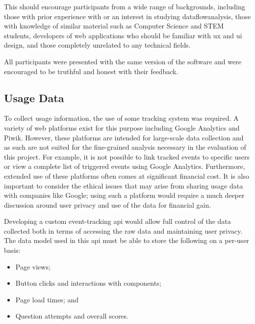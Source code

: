 \documentclass[bsc,twoside,singlespacing,parskip,logo,notimes,normalheadings]{infthesis}
\begin{document}
    This should encourage participants from a wide range of
    backgrounds, including those with prior experience with or an
    interest in studying \gls{dataflowanalysis}, those with knowledge
    of similar material such as Computer Science and STEM students,
    developers of web applications who should be familiar with
    \gls{ux} and \gls{ui} design, and those completely unrelated to
    any technical fields.

    All participants were presented with the same version of the
    software and were encouraged to be truthful and honest with their
    feedback.

        \subsection{Usage Data}\label{sec:impl-tracking-api}
        To collect usage information, the use of some tracking system
        was required. A variety of web platforms exist for this
        purpose including Google Analytics and Piwik. However, these
        platforms are intended for large-scale data collection and as
        such are not suited for the fine-grained analysis necessary in
        the evaluation of this project. For example, it is not
        possible to link tracked events to specific users or view a
        complete list of triggered events using Google
        Analytics. Furthermore, extended use of these platforms often
        comes at significant financial cost. It is also important to
        consider the ethical issues that may arise from sharing usage
        data with companies like Google; using such a platform would
        require a much deeper discussion around user privacy and use
        of the data for financial gain.

        Developing a custom event-tracking \gls{api} would allow full
        control of the data collected both in terms of accessing the
        raw data and maintaining user privacy. The data model used in
        this \gls{api} must be able to store the following on a
        per-user basis:

        \begin{itemize}
        \item Page views;
        \item Button clicks and interactions with components;
        \item Page load times; and
        \item Question attempts and overall scores.
        \end{itemize}
\end{document}
